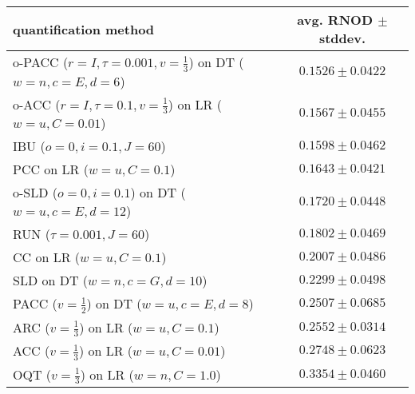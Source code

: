 \begin{tabular}{lc}
  \toprule
  quantification method & avg. RNOD $\pm$ stddev. \\
  \midrule
  o-PACC ($r=I, \tau=0.001, v=\frac{1}{3}$) on DT ($w=n, c=E, d=6$) & $\mathbf{0.1526 \pm 0.0422}$ \\
  o-ACC ($r=I, \tau=0.1, v=\frac{1}{3}$) on LR ($w=u, C=0.01$) & $0.1567 \pm 0.0455$ \\
  IBU ($o=0, i=0.1, J=60$) & $0.1598 \pm 0.0462$ \\
  PCC on LR ($w=u, C=0.1$) & $0.1643 \pm 0.0421$ \\
  o-SLD ($o=0, i=0.1$) on DT ($w=u, c=E, d=12$) & $0.1720 \pm 0.0448$ \\
  RUN ($\tau=0.001, J=60$) & $0.1802 \pm 0.0469$ \\
  CC on LR ($w=u, C=0.1$) & $0.2007 \pm 0.0486$ \\
  SLD on DT ($w=n, c=G, d=10$) & $0.2299 \pm 0.0498$ \\
  PACC ($v=\frac{1}{2}$) on DT ($w=u, c=E, d=8$) & $0.2507 \pm 0.0685$ \\
  ARC ($v=\frac{1}{3}$) on LR ($w=u, C=0.1$) & $0.2552 \pm 0.0314$ \\
  ACC ($v=\frac{1}{3}$) on LR ($w=u, C=0.01$) & $0.2748 \pm 0.0623$ \\
  OQT ($v=\frac{1}{3}$) on LR ($w=n, C=1.0$) & $0.3354 \pm 0.0460$ \\
  \bottomrule
\end{tabular}
